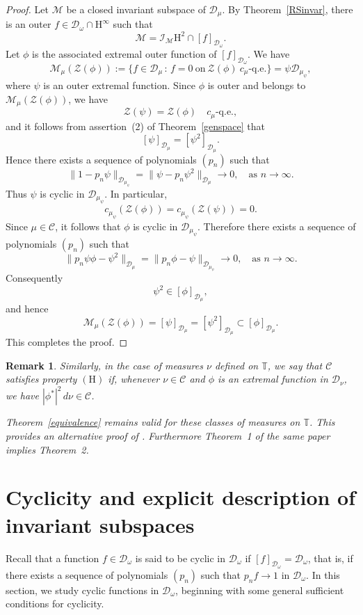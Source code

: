 \documentclass[12pt,reqno,a4paper]{amsart}
\newtheorem{rem}{Remark}
\newcommand{\cM}{{\mathcal{M}}}
\newcommand{\kH}{\mathrm{H^\infty  }}
\newcommand{\hH}{\mathrm{H^2 }}
\newcommand{\cZ}{{\mathcal{Z}}}
\newcommand{\cD}{{\mathcal{D}}}
\numberwithin{equation}{section}
\begin{document}
	
	\begin{proof}
		Let $\cM$ be a closed invariant subspace of $\cD_\mu$. By Theorem~\ref{RSinvar}, there is an  outer  $f\in   \cD_\omega\cap \kH$ such that 
		\[
		\cM=\mathcal{I}_\cM \hH\cap [f]_{  \cD_\omega}.
		\]
		Let $\phi$ is the associated extremal outer function of $[f]_{\cD_\omega}$. We have
		\[
		\mathcal{M}_\mu(\mathcal{Z}(\phi)) := \{ f \in \mathcal{D}_\mu \,:\, f = 0 \ \text{on} \ \mathcal{Z}(\phi)\ \text{$c_\mu$-q.e.} \} = \psi \mathcal{D}_{\mu_\psi},
		\]
		where $\psi$ is an outer extremal function. Since $\phi$ is outer and belongs to $\mathcal{M}_\mu(\mathcal{Z}(\phi))$, we have
		\[
		\mathcal{Z}(\psi) = \mathcal{Z}(\phi) \quad c_\mu\text{-q.e.},
		\]
		and it follows from assertion~(2) of Theorem~\ref{genspace} that
		\[
		[\psi]_{\mathcal{D}_\mu} = [\psi^2]_{\mathcal{D}_\mu}.
		\]
		Hence there exists a sequence of polynomials $(p_n)$ such that
		\[
		\|1 - p_n \psi\|_{\cD_{\mu_\psi}} = \|\psi - p_n \psi^2\|_{\cD_\mu} \longrightarrow 0,
		\quad \text{as } n \to \infty.
		\]
		Thus $\psi$ is cyclic in $\cD_{\mu_\psi}$. In particular,
		\[
		c_{\mu_\psi}(\cZ(\phi)) = c_{\mu_\psi}(\cZ(\psi)) = 0.
		\]
		Since $\mu \in \mathcal{C}$, it follows that $\phi$ is cyclic in $\mathcal{D}_{\mu_\psi}$. Therefore there exists a sequence of polynomials $(p_n)$ such that
		\[
		\|p_n \psi \phi - \psi^2\|_{\cD_\mu} 
		= \|p_n \phi - \psi\|_{\cD_{\mu_\psi}} \longrightarrow 0,
		\quad \text{as } n \to \infty.
		\]
		Consequently
		\[
		\psi^2 \in [\phi]_{\cD_\mu},
		\]
		and hence
		\[
		\cM_{\mu}(\cZ(\phi)) = [\psi]_{\cD_\mu} = [\psi^2]_{\cD_\mu} \subset [\phi]_{\cD_\mu}.
		\]
		This completes the proof.
	\end{proof}
	\begin{rem}\label{Rem}
		Similarly, in the case of measures $\nu$ defined on $\mathbb{T}$, we say that $\mathcal{C}$ satisfies property $(\mathrm{H})$ if, whenever $\nu \in \mathcal{C}$ and $\phi$ is an extremal function in $\mathcal{D}_\nu$, we have $|\phi^*|^2\, d\nu \in \mathcal{C}$.
		
		Theorem~\ref{equivalence} remains valid for these classes of measures on $\mathbb{T}$. This provides an alternative proof of \cite[Theorem~2]{EEK}. Furthermore Theorem~1 of the same paper implies Theorem~2.
	\end{rem}
	\section{Cyclicity and explicit description of invariant subspaces}
	Recall that a function $f \in \cD_\omega$ is said to be cyclic in $\cD_\omega$ if $[f]_{\cD_\omega} = \cD_\omega$, that is, if there exists a sequence of polynomials $(p_n)$ such that $p_n f \to 1$ in $\cD_\omega$. In this section, we study cyclic functions in $\cD_\omega$, beginning with some general sufficient conditions for cyclicity.
	
\end{document}

